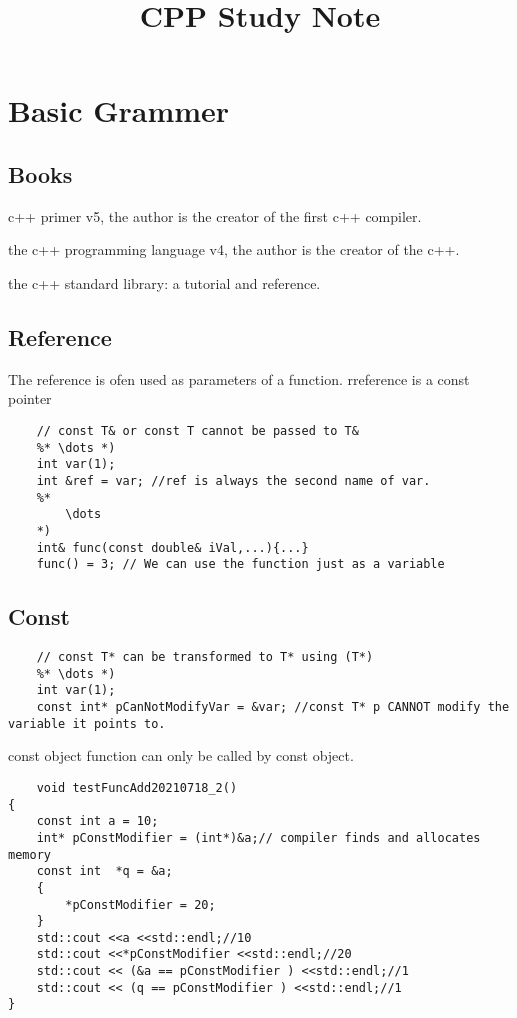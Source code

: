 \documentclass[UTF8]{article}
\begin{document}
\title{CPP Study Note}
 


\section{Basic Grammer}

\subsection{Books}

c++ primer v5, the author is the creator of the first c++ compiler.

the c++ programming language v4, the author is the creator of the c++.

the c++ standard library: a tutorial and reference.



\subsection{Reference}
The reference is ofen used as parameters of a function. 
rreference is a const pointer

\begin{lstlisting}
    // const T& or const T cannot be passed to T&
    %* \dots *)
    int var(1);
    int &ref = var; //ref is always the second name of var.
    %*
        \dots
    *)
    int& func(const double& iVal,...){...}
    func() = 3; // We can use the function just as a variable
\end{lstlisting}

 
\subsection{Const}
\begin{lstlisting}
    // const T* can be transformed to T* using (T*)
    %* \dots *)
    int var(1);
    const int* pCanNotModifyVar = &var; //const T* p CANNOT modify the variable it points to.
\end{lstlisting}
const object function can only be called by const object.\\

\begin{lstlisting}
    void testFuncAdd20210718_2()
{
    const int a = 10;
	int* pConstModifier = (int*)&a;// compiler finds and allocates memory
	const int  *q = &a;
	{
		*pConstModifier = 20;
	}
	std::cout <<a <<std::endl;//10
	std::cout <<*pConstModifier <<std::endl;//20
	std::cout << (&a == pConstModifier ) <<std::endl;//1
	std::cout << (q == pConstModifier ) <<std::endl;//1
}
\end{lstlisting}
\end{document}
